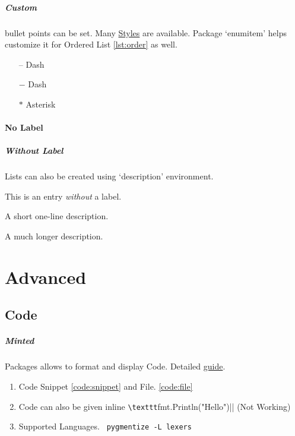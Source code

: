 \documentclass{report}[a4paper,12pt] %
\begin{document}
\paragraph{Custom} bullet points can be set. Many \href{https://latex-tutorial.com/bullet-styles/}{Styles} are available.
Package `enumitem' helps customize it for Ordered List \ref{lst:order} as well.
\begin{itemize}
  \label{lst:format}
  \item[--] Dash
  \item[$-$] Dash
  \item[$\ast$] Asterisk
\end{itemize}

\vspace{10pt}

\subsubsection{No Label}
\paragraph{Without Label} Lists can also be created using `description' environment.

\begin{description}
  \item This is an entry \textit{without} a label.
  \item[Something short] A short one-line description.
  \item[Something long] A much longer description. \lipsum[1]
\end{description}

\chapter{Advanced}
\section{Code}
\paragraph{Minted} Packages allows to format and display Code. Detailed \href{https://mirror.niser.ac.in/ctan/macros/latex/contrib/minted/minted.pdf}{guide}.

\begin{enumerate}
  \item Code Snippet \ref{code:snippet} and File. \ref{code:file}
  \item Code can also be given inline \verb|\texttt|fmt.Println("Hello")|| (Not Working)
  \item Supported Languages. \verb| pygmentize -L lexers|
\end{enumerate}
\end{document}
